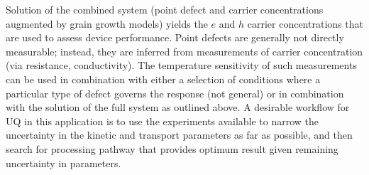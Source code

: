 \documentclass[11pt]{article}
\begin{document}
  Solution of the combined system (point defect and carrier
  concentrations augmented by grain growth models) yields the $e$ and
  $h$ carrier concentrations that are used to assess device
  performance. Point defects are generally not directly measurable;
  instead, they are inferred from measurements of carrier
  concentration (via resistance, conductivity). The temperature
  sensitivity of such measurements can be used in combination with
  either a selection of conditions where a particular type of defect
  governs the response (not general) or in combination with the
  solution of the full system as outlined above. A desirable workflow
  for UQ in this application is to use the experiments available to narrow
  the uncertainty in the kinetic and transport parameters as far as
  possible, and then search for processing pathway that provides
  optimum result given remaining uncertainty in parameters.


\end{document}
